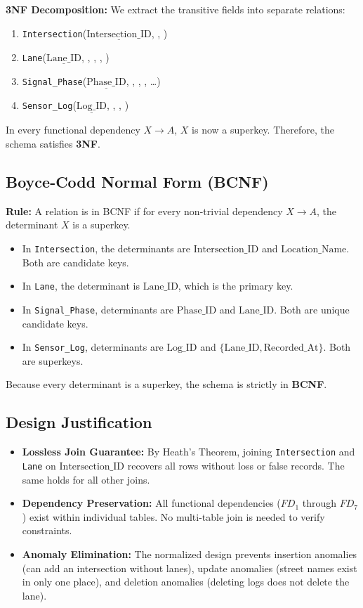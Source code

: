 \documentclass[11pt,a4paper]{article}
\begin{document}
\textbf{3NF Decomposition:} We extract the transitive fields into separate relations:
\begin{enumerate}
    \item \texttt{Intersection}($\underline{\text{Intersection\_ID}}$, , )
    \item \texttt{Lane}($\underline{\text{Lane\_ID}}$, , , , )
    \item \texttt{Signal\_Phase}($\underline{\text{Phase\_ID}}$, , , , \dots)
    \item \texttt{Sensor\_Log}($\underline{\text{Log\_ID}}$, , , )
\end{enumerate}
In every functional dependency $X \rightarrow A$, $X$ is now a superkey. Therefore, the schema satisfies \textbf{3NF}.

\subsection{Boyce-Codd Normal Form (BCNF)}
\textbf{Rule:} A relation is in BCNF if for every non-trivial dependency $X \rightarrow A$, the determinant $X$ is a superkey.
\begin{itemize}
    \item In \texttt{Intersection}, the determinants are $\text{Intersection\_ID}$ and $\text{Location\_Name}$. Both are candidate keys.
    \item In \texttt{Lane}, the determinant is $\text{Lane\_ID}$, which is the primary key.
    \item In \texttt{Signal\_Phase}, determinants are $\text{Phase\_ID}$ and $\text{Lane\_ID}$. Both are unique candidate keys.
    \item In \texttt{Sensor\_Log}, determinants are $\text{Log\_ID}$ and $\{\text{Lane\_ID}, \text{Recorded\_At}\}$. Both are superkeys.
\end{itemize}
Because every determinant is a superkey, the schema is strictly in \textbf{BCNF}.

\subsection{Design Justification}
\begin{itemize}
    \item \textbf{Lossless Join Guarantee:} By Heath's Theorem, joining \texttt{Intersection} and \texttt{Lane} on $\text{Intersection\_ID}$ recovers all rows without loss or false records. The same holds for all other joins.
    \item \textbf{Dependency Preservation:} All functional dependencies ($FD_1$ through $FD_7$) exist within individual tables. No multi-table join is needed to verify constraints.
    \item \textbf{Anomaly Elimination:} The normalized design prevents insertion anomalies (can add an intersection without lanes), update anomalies (street names exist in only one place), and deletion anomalies (deleting logs does not delete the lane).
\end{itemize}
\end{document}
